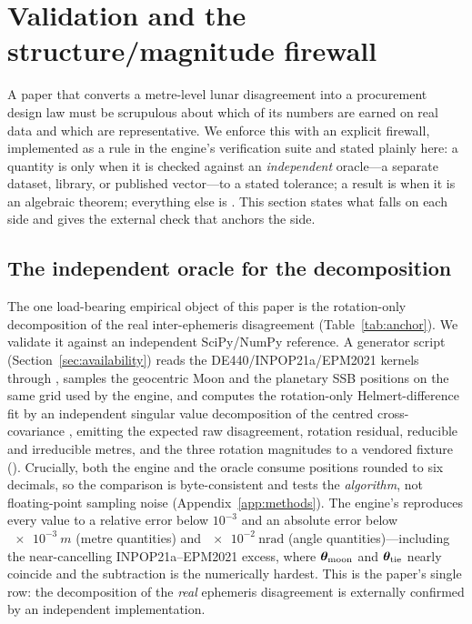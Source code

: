 \section{Validation and the structure/magnitude firewall}
\label{sec:validation}

A paper that converts a metre-level lunar disagreement into a procurement design law
must be scrupulous about which of its numbers are earned on real data and which are
representative. We enforce this with an explicit firewall, implemented as a rule in
the engine's verification suite and stated plainly here: a quantity is \Validated{}
only when it is checked against an \emph{independent} oracle---a separate dataset,
library, or published vector---to a stated tolerance; a result is \Proven{} when it is
an algebraic theorem; everything else is \Modelled{}. This section states what falls
on each side and gives the external check that anchors the \Validated{} side.

\subsection{The independent oracle for the decomposition}
\label{sec:oracle}

The one load-bearing empirical object of this paper is the rotation-only
decomposition of the real inter-ephemeris disagreement (Table~\ref{tab:anchor}). We
validate it against an independent SciPy/NumPy reference. A generator script
(Section~\ref{sec:availability}) reads the DE440/INPOP21a/EPM2021 kernels through
, samples the geocentric Moon and the planetary SSB positions on the
same grid used by the engine, and computes the rotation-only Helmert-difference fit
by an independent singular value decomposition of the centred cross-covariance
\citep{arun1987leastsquares}, emitting the expected raw disagreement, rotation
residual, reducible and irreducible metres, and the three rotation magnitudes to a
vendored fixture (). Crucially, both the engine and the oracle
consume positions rounded to six decimals, so the comparison is byte-consistent and
tests the \emph{algorithm}, not floating-point sampling noise
(Appendix~\ref{app:methods}). The engine's  reproduces every
value to a relative error below $10^{-3}$ and an absolute error below $\SI{e-3}{m}$
(metre quantities) and $\SI{e-2}{\nano\radian}$ (angle quantities)---including the
near-cancelling INPOP21a--EPM2021 excess, where $\bm{\theta}_{\mathrm{moon}}$ and
$\bm{\theta}_{\mathrm{tie}}$ nearly coincide and the subtraction is the numerically hardest.
This is the paper's single \Validated{} row: the decomposition of the \emph{real}
ephemeris disagreement is externally confirmed by an independent implementation.

